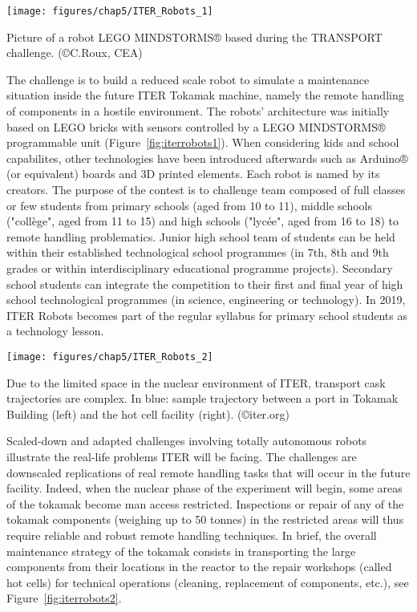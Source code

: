 \begin{marginfigure}
	\centering
	\texttt{[image: figures/chap5/ITER\_Robots\_1]}
	\caption{Picture of a robot LEGO MINDSTORMS® based during the TRANSPORT challenge. (©C.Roux, CEA)}
	\label{fig:iterrobots1}
\end{marginfigure}
The challenge is to build a reduced scale robot to simulate a maintenance situation inside the future ITER Tokamak machine, namely the remote handling of components in a hostile environment. The robots' architecture was initially based on LEGO bricks with sensors controlled by a LEGO MINDSTORMS® programmable unit (Figure~\ref{fig:iterrobots1}). When considering kids and school capabilites, other technologies  have been introduced afterwards such as Arduino® (or equivalent) boards and 3D printed elements. Each robot is named by its creators. The purpose of the contest is to challenge team composed of full classes or few students from primary schools (aged from 10 to 11), middle schools ("collège", aged from 11 to 15) and high schools ("lycée", aged from 16 to 18) to remote handling problematics. Junior high school team of students can be held within their established technological school programmes (in 7th, 8th and 9th grades or within interdisciplinary educational programme projects). Secondary school students can integrate the competition to their first and final year of high school technological programmes (in science, engineering or technology). In 2019, ITER Robots becomes part of the regular syllabus for primary school students as a technology lesson.

\begin{marginfigure}
	\centering
	\texttt{[image: figures/chap5/ITER\_Robots\_2]}
	\caption{Due to the limited space in the nuclear environment of ITER, transport cask trajectories are complex. In blue: sample trajectory between a port in Tokamak Building (left) and the hot cell facility (right). (©iter.org)}
	\label{fig:iterrobots2}
\end{marginfigure}

Scaled-down and adapted challenges involving totally autonomous robots illustrate the real-life problems ITER will be facing. The challenges are downscaled replications of real remote handling tasks that will occur in the future facility. Indeed, when the nuclear phase of the experiment will begin, some areas of the tokamak become man access restricted. Inspections or repair of any of the tokamak components (weighing up to 50 tonnes) in the restricted areas will thus require reliable and robust remote handling techniques. In brief, the overall maintenance strategy of the tokamak consists in transporting the large components from their locations in the reactor to the repair workshops (called hot cells) for technical operations (cleaning, replacement of components, etc.), see Figure~\ref{fig:iterrobots2}.

